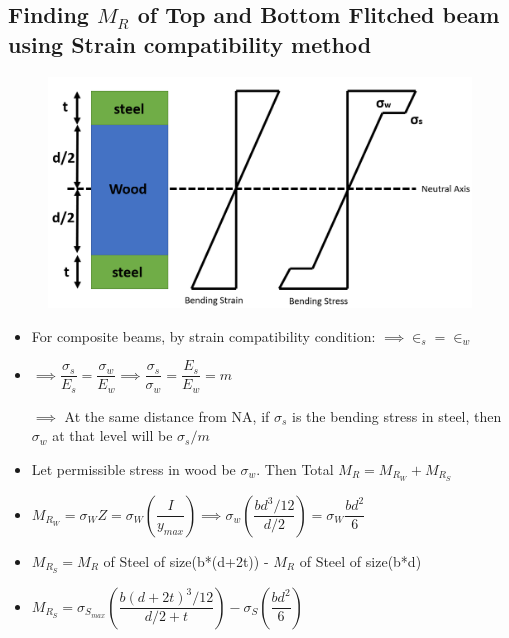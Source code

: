 \documentclass[8pt]{report}
\begin{document}
	\subsection{Finding $M_R$ of Top and Bottom Flitched beam using Strain compatibility method}
		\begin{figure}[H]
			\centering
			\includegraphics[scale=0.4]{flitchedbeam.png}
		\end{figure}
		\begin{itemize}
			\item For composite beams, by strain compatibility condition:  $\implies \in_s = \in_w$ 
			\item $\implies \dfrac{\sigma_s}{E_s} = \dfrac{\sigma_w}{E_w} \implies \dfrac{\sigma_s}{\sigma_w} = \dfrac{E_s}{E_w} = m$
			\item[$\implies$] At the same distance from NA, if $\sigma_s$ is the bending stress in steel, then $\sigma_w$ at that level will be $\sigma_s/m$
			\item Let permissible stress in wood be $\sigma_w$. Then Total $M_R = M_{R_W} + M_{R_S}$
			\item $M_{R_W} = \sigma_WZ = \sigma_W\left(\dfrac{I}{y_{max}}\right) \implies \sigma_w\left(\dfrac{bd^3/12}{d/2}\right) =  \sigma_W\dfrac{bd^2}{6}$
			\item $M_{R_S} = M_R$ of Steel of size(b*(d+2t)) - $M_R$ of Steel of size(b*d)
			\item $M_{R_S} = \sigma_{S_{max}}\left(\dfrac{b(d+2t)^3/12}{d/2 + t}\right) - \sigma_S\left(\dfrac{bd^2}{6}\right)$
		\end{itemize}\hrulefill
\end{document}
